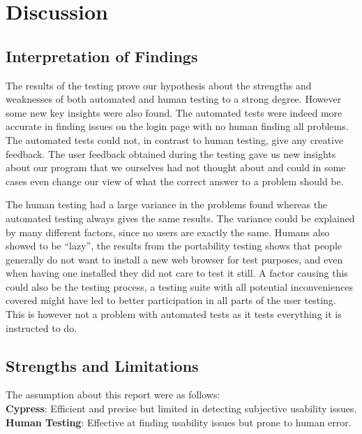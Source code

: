 \documentclass[journal,twocolumn]{IEEEtran}
\begin{document}
\section{Discussion}
\subsection{Interpretation of Findings}

The results of the testing prove our hypothesis about the strengths and weaknesses of both automated and human testing to a strong degree. However some new key insights were also found. The automated tests were indeed more accurate in finding issues on the login page with no human finding all problems. The automated tests could not, in contrast to human testing, give any creative feedback. The user feedback obtained during the testing gave us new insights about our program that we ourselves had not thought about and could in some cases even change our view of what the correct answer to a problem should be.

The human testing had a large variance in the problems found whereas the automated testing always gives the same results. The variance could be explained by many different factors, since no users are exactly the same. Humans also showed to be “lazy”, the results from the portability testing shows that people generally do not want to install a new web browser for test purposes, and even when having one installed they did not care to test it still. A factor causing this could also be the testing process, a testing suite with all potential inconveniences covered might have led to better participation in all parts of the user testing. This is however not a problem with automated tests as it tests everything it is instructed to do.


\subsection{Strengths and Limitations}
The assumption about this report were as follows:
\\
\textbf{Cypress}: Efficient and precise but limited in detecting subjective usability issues.
\\
\textbf{Human Testing}: Effective at finding usability issues but prone to human error.
\\
\end{document}
